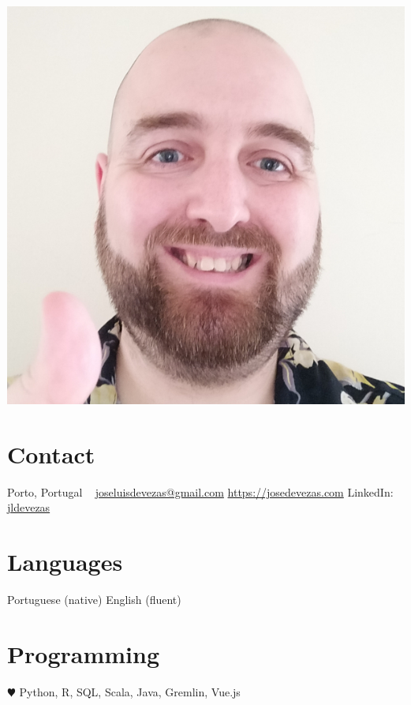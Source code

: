 \documentclass{friggeri-cv}
\begin{document}


\begin{aside} %
\includegraphics[width=\textwidth]{photo.jpg}
%
\section{Contact}
Porto, Portugal
~
{\footnotesize \href{mailto:joseluisdevezas@gmail.com}{joseluisdevezas@gmail.com}
\href{https://josedevezas.com}{https://josedevezas.com}
LinkedIn: \href{https://www.linkedin.com/in/jldevezas/?locale=en_US}{jldevezas}}
%
\section{Languages}
Portuguese (native)
English (fluent)
%
\section{Programming}
{\color{red} $\varheartsuit$} {\small Python, R, SQL, Scala, Java, Gremlin, Vue.js}
\end{aside}
\end{document}
